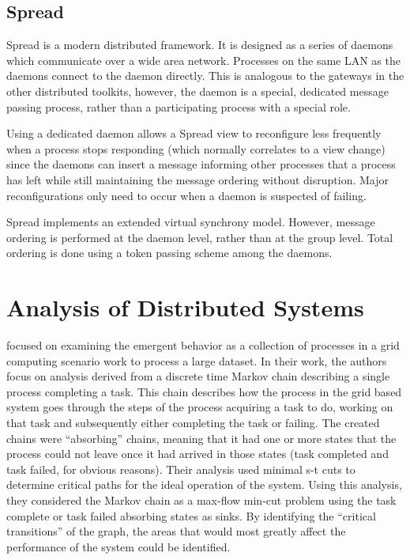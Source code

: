 \subsection{Spread}

Spread\cite{SPREADTOOLKIT} is a modern distributed framework. It is designed as a series of daemons which communicate over a wide area network. Processes on the same LAN as the daemons connect to the daemon directly. This is analogous to the gateways in the other distributed toolkits, however, the daemon is a special, dedicated message passing process, rather than a participating process with a special role.

Using a dedicated daemon allows a Spread view to reconfigure less frequently when a process stops responding (which normally correlates to a view change) since the daemons can insert a message informing other processes that a process has left while still maintaining the message ordering without disruption. Major reconfigurations only need to occur when a daemon is suspected of failing.

Spread implements an extended virtual synchrony model. However, message ordering is performed at the daemon level, rather than at the group level. Total ordering is done using a token passing scheme among the daemons.

\section{Analysis of Distributed Systems}

\cite{markov-distributed} focused on examining the emergent behavior as a collection of processes in a grid computing scenario work to process a large dataset.
In their work, the authors focus on analysis derived from a discrete time Markov chain describing a single process completing a task.
This chain describes how the process in the grid based system goes through the steps of the process acquiring a task to do, working on that task and subsequently either completing the task or failing.
The created chains were ``absorbing'' chains, meaning that it had one or more states that the process could not leave once it had arrived in those states (task completed and task failed, for obvious reasons).
Their analysis used minimal s-t cuts to determine critical paths for the ideal operation of the system.
Using this analysis, they considered the Markov chain as a max-flow min-cut problem using the task complete or task failed absorbing states as sinks.
By identifying the ``critical transitions'' of the graph, the areas that would most greatly affect the performance of the system could be identified.

